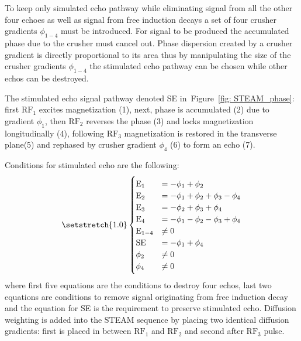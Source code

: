  To keep only simulated echo pathway while eliminating signal from all the other four echoes as well as signal from free induction decays a set of four crusher gradients $\phi_{1-4}$ must be introduced. 
 For signal to be produced the accumulated phase due to the crusher must cancel out. 
 Phase dispersion created by a crusher gradient is directly proportional to its area thus by manipulating the size of the crusher gradients $\phi_{1-4}$ the stimulated echo pathway can be chosen while other echos can be destroyed.

 The stimulated echo signal pathway denoted SE in~Figure~\ref{fig: STEAM_phase}: first $\mathrm{RF_1}$ excites magnetization (1), next, phase is accumulated (2) due to gradient $\phi_1$, then $\mathrm{RF_2}$ reverses the phase (3) and locks magnetization longitudinally (4), following $\mathrm{RF_3}$ magnetization is restored in the transverse plane(5) and rephased by crusher gradient $\phi_4$ (6) to form an echo (7).

Conditions for stimulated echo are the following:
\begin{equation}\label{eq: STEAM phase}
{\setstretch{1.0}
\begin{cases}
    \mathrm{E_1} &= -\phi_1 + \phi_2\\
    \mathrm{E_2} &= -\phi_1 + \phi_2 + \phi_3 - \phi_4\\
    \mathrm{E_3} &= -\phi_2 + \phi_3 + \phi_4\\
    \mathrm{E_4} &= -\phi_1 - \phi_2 - \phi_3 + \phi_4\\
    \mathrm{E_{1-4}} &\neq 0\\
    \mathrm{SE} &= -\phi_1 + \phi_4\\
    \phi_2 &\neq 0\\
    \phi_4 &\neq 0\\
\end{cases}
}
\end{equation}
where first five equations are the conditions to destroy four echos, last two equations are conditions to remove signal originating from free induction decay and the equation for SE is the requirement to preserve stimulated echo. 
Diffusion weighting is added into the STEAM sequence by placing two identical diffusion gradients: first is placed in between $\mathrm{RF_1}$ and $\mathrm{RF_2}$ and second after $\mathrm{RF_3}$ pulse.
